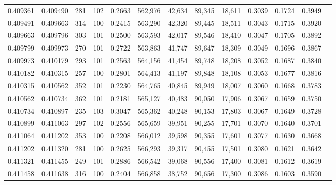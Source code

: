 \begin{tabular}{rrrrrrrrrrrrr}
0.409361 & 0.409490 &   281 & 102 &                                     0.2663 & 562,976 &  42,634 &  89,345 &  18,611 & 0.3039 & 0.1724 & 0.3949 \\
0.409491 & 0.409663 &   314 & 100 &                                     0.2415 & 563,290 &  42,320 &  89,445 &  18,511 & 0.3043 & 0.1715 & 0.3920 \\
0.409663 & 0.409796 &   303 & 101 &                                     0.2500 & 563,593 &  42,017 &  89,546 &  18,410 & 0.3047 & 0.1705 & 0.3892 \\
0.409799 & 0.409973 &   270 & 101 &                                     0.2722 & 563,863 &  41,747 &  89,647 &  18,309 & 0.3049 & 0.1696 & 0.3867 \\
0.409973 & 0.410179 &   293 & 101 &                                     0.2563 & 564,156 &  41,454 &  89,748 &  18,208 & 0.3052 & 0.1687 & 0.3840 \\
0.410182 & 0.410315 &   257 & 100 &                                     0.2801 & 564,413 &  41,197 &  89,848 &  18,108 & 0.3053 & 0.1677 & 0.3816 \\
0.410315 & 0.410562 &   352 & 101 &                                     0.2230 & 564,765 &  40,845 &  89,949 &  18,007 & 0.3060 & 0.1668 & 0.3783 \\
0.410562 & 0.410734 &   362 & 101 &                                     0.2181 & 565,127 &  40,483 &  90,050 &  17,906 & 0.3067 & 0.1659 & 0.3750 \\
0.410734 & 0.410897 &   235 & 103 &                                     0.3047 & 565,362 &  40,248 &  90,153 &  17,803 & 0.3067 & 0.1649 & 0.3728 \\
0.410899 & 0.411063 &   297 & 102 &                                     0.2556 & 565,659 &  39,951 &  90,255 &  17,701 & 0.3070 & 0.1640 & 0.3701 \\
0.411064 & 0.411202 &   353 & 100 &                                     0.2208 & 566,012 &  39,598 &  90,355 &  17,601 & 0.3077 & 0.1630 & 0.3668 \\
0.411202 & 0.411320 &   281 & 100 &                                     0.2625 & 566,293 &  39,317 &  90,455 &  17,501 & 0.3080 & 0.1621 & 0.3642 \\
0.411321 & 0.411455 &   249 & 101 &                                     0.2886 & 566,542 &  39,068 &  90,556 &  17,400 & 0.3081 & 0.1612 & 0.3619 \\
0.411458 & 0.411638 &   316 & 100 &                                     0.2404 & 566,858 &  38,752 &  90,656 &  17,300 & 0.3086 & 0.1603 & 0.3590 \\

\end{tabular}
